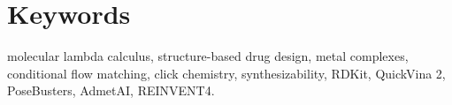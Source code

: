 \documentclass[10pt]{article}
\theoremstyle{definition}
\begin{document}
\section*{Keywords}
molecular lambda calculus, structure-based drug design, metal complexes,
conditional flow matching, click chemistry, synthesizability, RDKit,
QuickVina 2, PoseBusters, AdmetAI, REINVENT4.





\makeatletter
\let\WFcuaacOriginalLabel\label
\newif\if@WFcuaacFirstSeen  %
\@WFcuaacFirstSeenfalse
\def\WFcuaacFilteredLabel#1{%
  \def\WFcuaacTempArg{#1}%
  \ifx\WFcuaacTempArg\WFcuaacEqReduction
    \if@WFcuaacFirstSeen
      \WFcuaacOriginalLabel{eq:cuaac-reduction-click}%
    \else
      \@WFcuaacFirstSeentrue
      \WFcuaacOriginalLabel{#1}%
    \fi
  \else
    \WFcuaacOriginalLabel{#1}%
  \fi
}
\def\WFcuaacEqReduction{eq:cuaac-reduction}
\let\label\WFcuaacFilteredLabel
\makeatother

\makeatletter
\let\label\WFcuaacOriginalLabel
\makeatother
\end{document}
